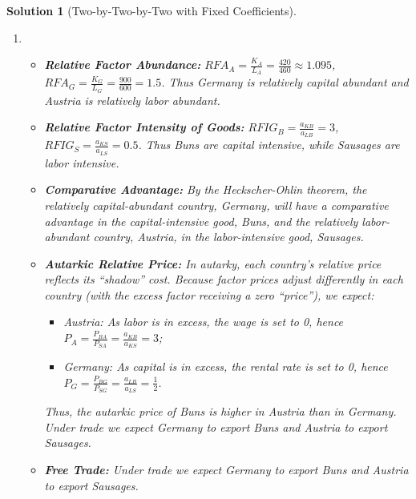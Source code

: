 \documentclass[a4paper,12pt]{article} %
\theoremstyle{nonitalic}
\newtheorem{solution}{Solution}
\begin{document}
\begin{solution}[Two-by-Two-by-Two with Fixed Coefficients]
    \
    
    \begin{enumerate}
        \item[1.] 
        \begin{itemize}
            \item \textbf{Relative Factor Abundance:} $RFA_A = \frac{K_A}{L_A} = \frac{420}{460} \approx 1.095$, $RFA_G = \frac{K_G}{L_G} = \frac{900}{600} = 1.5$. Thus Germany is relatively capital abundant and Austria is relatively labor abundant.
            \item \textbf{Relative Factor Intensity of Goods:} $RFIG_B = \frac{a_{KB}}{a_{LB}} = 3$, $RFIG_S = \frac{a_{KS}}{a_{LS}} = 0.5$. Thus Buns are capital intensive, while Sausages are labor intensive.
            \item \textbf{Comparative Advantage:} By the Heckscher-Ohlin theorem, the relatively capital-abundant country, Germany, 
            will have a comparative advantage in the capital-intensive good, Buns, 
            and the relatively labor-abundant country, Austria, in the labor-intensive good, Sausages.
            \item \textbf{Autarkic Relative Price:} In autarky, each country's relative price reflects its ``shadow'' cost. Because factor prices adjust differently in each country (with the excess factor receiving a zero ``price''), we expect:
                \begin{itemize}
                    \item Austria: As labor is in excess, the wage is set to 0, hence $P_A = \frac{P_{BA}}{P_{SA}} = \frac{a_{KB}}{a_{KS}} = 3$;
                    \item Germany: As capital is in excess, the rental rate is set to 0, hence $P_G = \frac{P_{BG}}{P_{SG}} = \frac{a_{LB}}{a_{LS}} = \frac{1}{2}$.
                \end{itemize}
                Thus, the autarkic price of Buns is higher in Austria than in Germany. Under trade we expect Germany to export Buns and Austria to export Sausages.
            \item \textbf{Free Trade:} Under trade we expect Germany to export Buns and Austria to export Sausages.
        \end{itemize}


\end{enumerate}
\end{solution}
\end{document}
